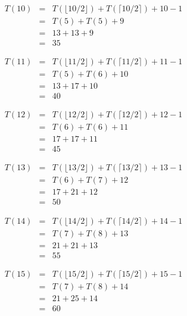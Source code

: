 \documentclass[12pt]{scrartcl}
\begin{document}
\begin{enumerate}
	\begin{eqnarray}
		T(10)		&	=	&	T(\lfloor 10 / 2 \rfloor) + T(\lceil 10 / 2 \rceil) + 10 - 1 \nonumber \\
				&	=	&	T(5)	+	T(5)	+ 9  \nonumber \\
				&	=	&	13 + 13 + 9  \nonumber \\
				&	=	&	35  \nonumber 
	\end{eqnarray}
	
	\begin{eqnarray}
		T(11)		&	=	&	T(\lfloor 11 / 2 \rfloor) + T(\lceil 11 / 2 \rceil) + 11 - 1 \nonumber \\
				&	=	&	T(5)	+	T(6)	+ 10  \nonumber \\
				&	=	&	13 + 17 + 10  \nonumber \\
				&	=	&	40   \nonumber 
	\end{eqnarray}

	\begin{eqnarray}
		T(12)		&	=	&	T(\lfloor 12 / 2 \rfloor) + T(\lceil 12 / 2 \rceil) + 12 - 1 \nonumber \\
				&	=	&	T(6)	+	T(6)	+ 11  \nonumber \\
				&	=	&	17 + 17 + 11  \nonumber \\
				&	=	&	45   \nonumber 
	\end{eqnarray}
	
	\begin{eqnarray}
		T(13)		&	=	&	T(\lfloor 13 / 2 \rfloor) + T(\lceil 13 / 2 \rceil) + 13- 1 \nonumber \\
				&	=	&	T(6)	+	T(7)	+ 12  \nonumber \\
				&	=	&	17 + 21 + 12  \nonumber \\
				&	=	&	50   \nonumber 
	\end{eqnarray}
	
	\begin{eqnarray}
		T(14)		&	=	&	T(\lfloor 14 / 2 \rfloor) + T(\lceil 14 / 2 \rceil) + 14 - 1 \nonumber \\
					&	=	&	T(7)	+	T(8)	+ 13  \nonumber \\
					&	=	&	21 + 21 + 13  \nonumber \\
					&	=	&	55   \nonumber 
	\end{eqnarray}
	
	\begin{eqnarray}
		T(15)		&	=	&	T(\lfloor 15 / 2 \rfloor) + T(\lceil 15 / 2 \rceil) + 15 - 1 \nonumber \\
					&	=	&	T(7)	+	T(8)	+ 14  \nonumber \\
					&	=	&	21 + 25 + 14  \nonumber \\
					&	=	&	60   \nonumber 
	\end{eqnarray}
	

\end{enumerate}
\end{document}
